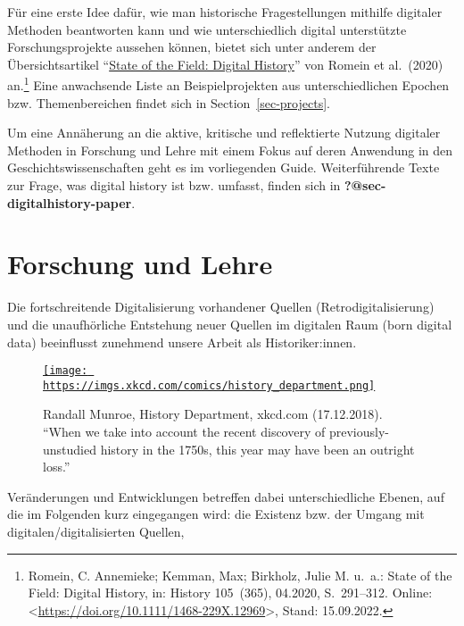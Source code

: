 \documentclass[
  letterpaper,
]{book}
\begin{document}
Für eine erste Idee dafür, wie man historische Fragestellungen mithilfe
digitaler Methoden beantworten kann und wie unterschiedlich digital
unterstützte Forschungsprojekte aussehen können, bietet sich unter
anderem der Übersichtsartikel
``\href{https://onlinelibrary.wiley.com/doi/10.1111/1468-229X.12969}{State
of the Field: Digital History}'' von Romein et al.~(2020) an.\footnote{Romein,
  C. Annemieke; Kemman, Max; Birkholz, Julie M. u.~a.: State of the
  {Field}: {Digital} {History}, in: History 105~(365), 04.2020,
  S.~291--312. Online:
  \textless{}\url{https://doi.org/10.1111/1468-229X.12969}\textgreater,
  Stand: 15.09.2022.} Eine anwachsende Liste an Beispielprojekten aus
unterschiedlichen Epochen bzw. Themenbereichen findet sich in
Section~\ref{sec-projects}.

Um eine Annäherung an die aktive, kritische und reflektierte Nutzung
digitaler Methoden in Forschung und Lehre mit einem Fokus auf deren
Anwendung in den Geschichtswissenschaften geht es im vorliegenden Guide.
Weiterführende Texte zur Frage, was digital history ist bzw. umfasst,
finden sich in \textbf{?@sec-digitalhistory-paper}.


\hypertarget{forschung-und-lehre}{%
\chapter{Forschung und Lehre}\label{forschung-und-lehre}}

Die fortschreitende Digitalisierung vorhandener Quellen
(Retrodigitalisierung) und die unaufhörliche Entstehung neuer Quellen im
digitalen Raum (born digital data) beeinflusst zunehmend unsere Arbeit
als Historiker:innen.

\begin{figure}

\href{history_department}{\texttt{[image: https://imgs.xkcd.com/comics/history\_department.png]}}

\caption{Randall Munroe, History Department, xkcd.com (17.12.2018).
``When we take into account the recent discovery of previously-unstudied
history in the 1750s, this year may have been an outright loss.''}

\end{figure}

Veränderungen und Entwicklungen betreffen dabei unterschiedliche Ebenen,
auf die im Folgenden kurz eingegangen wird: die Existenz bzw. der Umgang
mit digitalen/digitalisierten Quellen,
\end{document}
